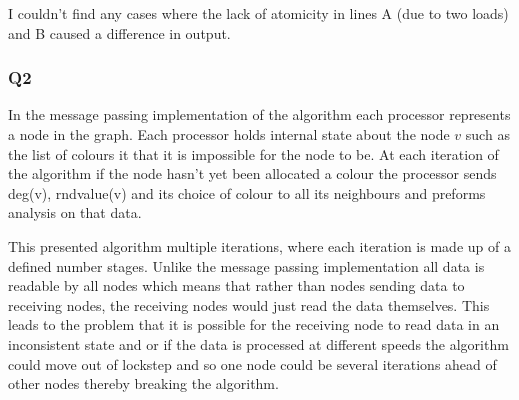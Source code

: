 \documentclass[11pt,a4paper]{article}
\begin{document}
I couldn't find any cases where the lack of atomicity in lines A (due to
two loads) and B caused a difference in output.

\newpage
\subsubsection*{Q2}


In the message passing implementation of the algorithm each processor
represents a node in the graph. Each processor holds internal state
about the node $v$ such as the list of colours it that it is impossible
for the node to be. At each iteration of the algorithm if the node
hasn't yet been allocated a colour the processor sends deg(v),
rndvalue(v) and its choice of colour to all its neighbours and preforms
analysis on that data.

This presented algorithm multiple iterations, where each iteration is
made up of a defined number stages. Unlike the message passing
implementation all data is readable by all nodes which means that rather
than nodes sending data to receiving nodes, the receiving nodes would
just read the data themselves. This leads to the problem that it is
possible for the receiving node to read data in an inconsistent state
and or if the data is processed at different speeds the algorithm could
move out of lockstep and so one node could be several iterations ahead
of other nodes thereby breaking the algorithm.

%
\end{document}
